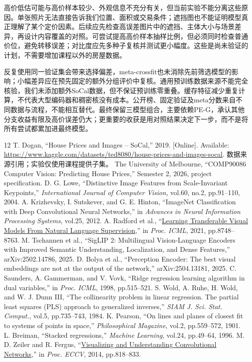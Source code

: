 \documentclass[conference,a4paper]{IEEEtran}
\begin{document}
高价低估可能与高价样本较少、外观信息不充分有关，但当前实验不能分离这些原因。单张照片无法直接告诉我们位置、面积或交易条件；遮挡图也不能证明模型真正理解了某个定价因素。后续应先检查高误差图片中的遮挡、主体大小与场景差异，再设计内容覆盖的对照。可尝试提高高价样本抽样比例，但必须同时检查普通价位，避免转移误差；对比度应先多种子复核并测试更小幅度。这些是尚未验证的计划，不需要增加课程以外的房屋数据。

反复使用同一验证集会带来选择偏差，meta-crossfit也未消除先前筛选模型的影响；小幅差异应在预先固定的额外分组评价中复核。通用预训练数据来源不能完全核验，我们未添加额外SoCal数据，但不保证预训练零重叠。缓存特征减少重复计算，不代表大型编码器和稠密核没有成本。公开榜、固定验证及meta分数来自不同数据与流程，不能相互替代。最终保留三模型组合，主要依赖PE-G，承认其他分支收益有限及高价误差仍大；更重要的收获是用对照结果决定下一步，而不是将所有尝试都累加进最终模型。

\clearpage
\begin{thebibliography}{12}
 T. Dogan, ``House Prices and Images -- SoCal,'' 2019. [Online]. Available: \url{https://www.kaggle.com/datasets/ted8080/house-prices-and-images-socal}. 数据来源引用；实验仅使用课程提供子集。
 The University of Melbourne, ``COMP90086 Computer Vision: Predicting House Prices,'' Semester 2, 2026, project specification.
 D. G. Lowe, ``Distinctive Image Features from Scale-Invariant Keypoints,'' \emph{International Journal of Computer Vision}, vol.60, no.2, pp.91--110, 2004.
 A. Krizhevsky, I. Sutskever, and G. E. Hinton, ``ImageNet Classification with Deep Convolutional Neural Networks,'' in \emph{Advances in Neural Information Processing Systems}, vol.25, 2012.
 A. Radford et al., ``\href{https://proceedings.mlr.press/v139/radford21a.html}{Learning Transferable Visual Models From Natural Language Supervision},'' in \emph{Proc. ICML}, 2021, pp.8748--8763.
 M. Tschannen et al., ``SigLIP 2: Multilingual Vision-Language Encoders with Improved Semantic Understanding, Localization, and Dense Features,'' arXiv:2502.14786, 2025.
 D. Bolya et al., ``Perception Encoder: The best visual embeddings are not at the output of the network,'' arXiv:2504.13181, 2025.
 C. Saunders, A. Gammerman, and V. Vovk, ``Ridge regression learning algorithm in dual variables,'' in \emph{Proc. ICML}, 1998, pp.515--521.
 S. Wold, A. Ruhe, H. Wold, and W. J. Dunn III, ``The collinearity problem in linear regression. The partial least squares (PLS) approach to generalized inverses,'' \emph{SIAM J. Sci. Stat. Comput.}, vol.5, pp.735--743, 1984.
 K. Pearson, ``On lines and planes of closest fit to systems of points in space,'' \emph{Philosophical Magazine}, vol.2, pp.559--572, 1901.
 L. Breiman, ``Stacked regressions,'' \emph{Machine Learning}, vol.24, pp.49--64, 1996.
 M. D. Zeiler and R. Fergus, ``\href{https://arxiv.org/abs/1311.2901}{Visualizing and Understanding Convolutional Networks},'' in \emph{Proc. ECCV}, 2014, pp.818--833.
\end{thebibliography}
\end{document}
